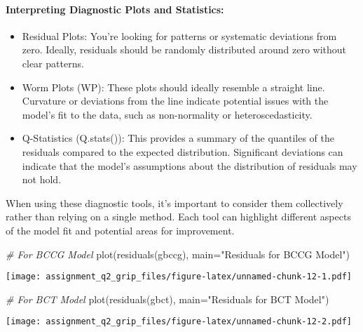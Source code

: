 \documentclass[
]{article}
\newenvironment{Shaded}{\begin{snugshade}}{\end{snugshade}}
\newcommand{\AttributeTok}[1]{\textcolor[rgb]{0.77,0.63,0.00}{#1}}
\newcommand{\CommentTok}[1]{\textcolor[rgb]{0.56,0.35,0.01}{\textit{#1}}}
\newcommand{\FunctionTok}[1]{\textcolor[rgb]{0.00,0.00,0.00}{#1}}
\newcommand{\NormalTok}[1]{#1}
\newcommand{\StringTok}[1]{\textcolor[rgb]{0.31,0.60,0.02}{#1}}
\begin{document}
\hypertarget{interpreting-diagnostic-plots-and-statistics}{%
\paragraph{Interpreting Diagnostic Plots and
Statistics:}\label{interpreting-diagnostic-plots-and-statistics}}

\begin{itemize}
\item
  Residual Plots: You're looking for patterns or systematic deviations
  from zero. Ideally, residuals should be randomly distributed around
  zero without clear patterns.
\item
  Worm Plots (WP): These plots should ideally resemble a straight line.
  Curvature or deviations from the line indicate potential issues with
  the model's fit to the data, such as non-normality or
  heteroscedasticity.
\item
  Q-Statistics (Q.stats()): This provides a summary of the quantiles of
  the residuals compared to the expected distribution. Significant
  deviations can indicate that the model's assumptions about the
  distribution of residuals may not hold.
\end{itemize}

When using these diagnostic tools, it's important to consider them
collectively rather than relying on a single method. Each tool can
highlight different aspects of the model fit and potential areas for
improvement.

\begin{Shaded}
\begin{Highlighting}[]
\CommentTok{\# For BCCG Model}
\FunctionTok{plot}\NormalTok{(}\FunctionTok{residuals}\NormalTok{(gbccg), }\AttributeTok{main=}\StringTok{"Residuals for BCCG Model"}\NormalTok{)}
\end{Highlighting}
\end{Shaded}

\texttt{[image: assignment\_q2\_grip\_files/figure-latex/unnamed-chunk-12-1.pdf]}

\begin{Shaded}
\begin{Highlighting}[]
\CommentTok{\# For BCT Model}
\FunctionTok{plot}\NormalTok{(}\FunctionTok{residuals}\NormalTok{(gbct), }\AttributeTok{main=}\StringTok{"Residuals for BCT Model"}\NormalTok{)}
\end{Highlighting}
\end{Shaded}

\texttt{[image: assignment\_q2\_grip\_files/figure-latex/unnamed-chunk-12-2.pdf]}
\end{document}
